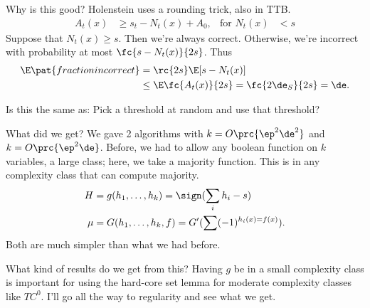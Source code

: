 Why is this good?  Holenstein uses a rounding trick, also in TTB.
\begin{align}
A_t(x) & \ge s_t-N_t(x)+A_0, & \text{for }N_t(x)&<s
\end{align}
Suppose that $N_t(x)\ge s$. Then we're always correct. %
Otherwise, we're incorrect with probability at most $\fc{s-N_t(x)}{2s}$.  %
Thus 
\begin{align}
\E\pat{fraction incorrect} & = \rc{2s} \E[s-N_t(x)]\\
&\le \E\fc{A_t(x)}{2s} = \fc{2\de_S}{2s} = \de.
\end{align}

Is this the same as: Pick a threshold at random and use that threshold?


What did we get? We gave 2 algorithms with $k=O\prc{\ep^2\de^2}$ and $k=O\prc{\ep^2\de}$. Before, we had to allow any boolean function on $k$ variables, a large class; here, we take a majority function.
This is in any complexity class that can compute majority.
\begin{align}
H&=g(h_1,\ldots, h_k) =\sign(\sum_i h_i-s)\\
\mu&=G(h_1,\ldots, h_k,f) = G'(\sum (-1)^{h_i(x)=f(x)}).
\end{align}
Both are much simpler than what we had before.

What kind of results do we get from this? 
Having $g$ be in a small complexity class is important for using the hard-core set lemma for moderate complexity classes like $TC^0$. I'll go all the way to regularity and see what we get.

